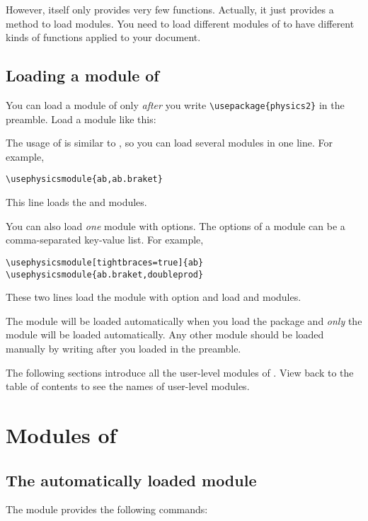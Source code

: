 \documentclass[11pt,letterpaper]{article}
\begin{document}
However,  itself only provides very few functions. Actually, it
just provides a method to load modules. You need to load different modules of
 to have different kinds of functions applied to your document.

\subsection{Loading a module of }
You can load a module of  only \emph{after} you write
\verb|\usepackage{physics2}| in the preamble. Load a  module
like this:
\begin{center}
\end{center}
The usage of  is similar to , so you can
load several modules in one line. For example,
\begin{Verbatim}
\usephysicsmodule{ab,ab.braket}
\end{Verbatim}
This line loads the  and  modules.

You can also load \emph{one} module with options. The options of a
 module can be a comma-separated key-value list. For example,
\begin{Verbatim}
\usephysicsmodule[tightbraces=true]{ab}
\usephysicsmodule{ab.braket,doubleprod}
\end{Verbatim}
These two lines load the  module with option
 and load  and 
modules.

\pardanger
The  module will be loaded automatically when you load the
 package and \emph{only} the  module will be
loaded automatically. Any other module should be loaded manually by writing
 after you loaded  in the
preamble.

The following sections introduce all the user-level modules of .
View back to the table of contents to see the names of user-level modules.

\section{Modules of }
\subsection{The automatically loaded  module}
The  module provides the following commands:
\end{document}
